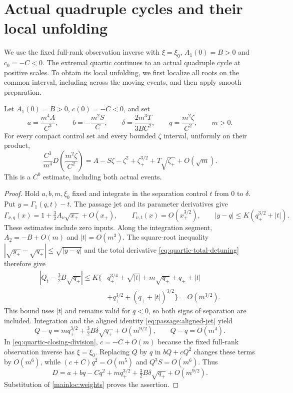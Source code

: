 \section{Actual quadruple cycles and their local unfolding}
\label{sec:actual-bifurcations}

We use the fixed full-rank observation inverse with $\xi=\xi_0$,
$A_1(0)=B>0$ and $c_0=-C<0$. The extremal quartic continues to an
actual quadruple cycle at positive scales. To obtain its local
unfolding, we first localize all roots on the common interval, including
across the moving events, and then apply smooth preparation.

\begin{lemma}
\label{mainloc:cross-event}
Let $A_1(0)=B>0$, $c(0)=-C<0$, and set
\begin{equation}\label{mainloc:weights}
 a=\frac{m^4A}{C^3},\qquad b=-\frac{m^2S}{C},\qquad
 \delta=\frac{2m^3T}{3BC^2},\qquad q=\frac{m^2\zeta}{C^2},
 \qquad m>0.
\end{equation}
For every compact control set and every bounded $\zeta$ interval,
uniformly on their product,
\begin{equation}\label{mainloc:full-limit}
 \frac{C^3}{m^4}D\left(\frac{m^2\zeta}{C^2}\right)
 =A-S\zeta-\zeta^2+\zeta_+^{3/2}
                 +T\sqrt{\zeta_+}+O(\sqrt m).
\end{equation}
This is a $C^0$ estimate, including both actual events.
\end{lemma}

\begin{proof}
Hold $a,b,m,\xi_0$ fixed and integrate in the separation control
$t$ from $0$ to $\delta$. Put $y=\Gamma_1(q,t)-t$. The passage
jet and its parameter derivatives give
\[
 \Gamma_{\nu,q}(x)=1+\tfrac32A_\nu\sqrt{x_+}+O(x_+),\qquad
 \Gamma_{\nu,t}(x)=O(x_+^{3/2}),\qquad
 |y-q|\le K(q_+^{3/2}+|t|).
\]
These estimates include zero inputs. Along the integration segment,
$A_2=-B+O(m)$ and $|t|=O(m^3)$. The square-root inequality
$|\sqrt{y_+}-\sqrt{q_+}|\le\sqrt{|y-q|}$ and the total derivative
\eqref{eq:quartic-total-detuning} therefore give
\begin{align*}
 \left|Q_t-\tfrac32B\sqrt{q_+}\right|
 \le K\{&q_+^{3/4}+\sqrt{|t|}+m\sqrt{q_+}+q_++|t|\\
        &+q_+^{3/2}+(q_++|t|)^{3/2}\}=O(m^{3/2}).
\end{align*}
This bound uses $|t|$ and remains valid for $q<0$, so both signs
of separation are included. Integration and the aligned identity
\eqref{eq:passage:aligned-jet} yield
\[
 Q-q=mq_+^{3/2}+\tfrac32B\delta\sqrt{q_+}+O(m^{9/2}),
 \qquad Q-q=O(m^4).
\]
In \eqref{eq:quartic-closing-division}, $c=-C+O(m)$ because the
fixed full-rank observation inverse has $\xi=\xi_0$. Replacing $Q$ by $q$
in $bQ+cQ^2$ changes these terms by $O(m^6)$, while
$(c+C)q^2=O(m^5)$ and $Q^3S=O(m^6)$. Thus
\[
 D=a+bq-Cq^2+mq_+^{3/2}
                    +\tfrac32B\delta\sqrt{q_+}+O(m^{9/2}).
\]
Substitution of \eqref{mainloc:weights} proves the assertion.
\end{proof}

